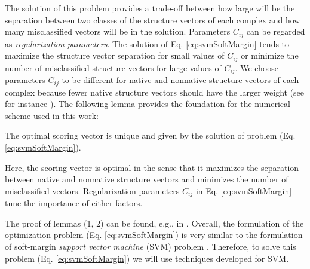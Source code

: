 The solution of this problem provides a trade-off between how large will be the separation between two classes of the structure vectors of each 
complex and how many misclassified vectors will be in the solution. Parameters $C_{ij}$ can be regarded as {\em regularization parameters}. 
The solution of Eq. \ref{eq:svmSoftMargin} tends to maximize the structure vector separation for small values of $C_{ij}$ or minimize the number 
of misclassified structure vectors for large values of  $C_{ij}$. We choose parameters $C_{ij}$ to be different for native and nonnative structure 
vectors of each complex because fewer native structure vectors should have the larger weight (see for instance \cite{Akbani2004}). 
%
The following lemma provides the foundation for the numerical scheme used in this work:
%
\begin{lemma}
The optimal scoring vector is unique and given by the solution of problem (Eq. \ref{eq:svmSoftMargin}).
\label{lemma2}
\end{lemma}
%
\begin{remark}
Here, the scoring vector is optimal in the sense that it maximizes the separation between native and nonnative structure vectors and minimizes the 
number of misclassified vectors. Regularization parameters $C_{ij}$ in Eq. \ref{eq:svmSoftMargin} tune the importance of either factors.
\end{remark}
%
The proof of lemmas (1, 2) can be found, e.g., in \cite{Crisp2000}.
Overall, the formulation of the optimization problem (Eq. \ref{eq:svmSoftMargin}) is very similar to the formulation of soft-margin 
\emph{support vector machine} (SVM) problem \cite{Cortes1995}. Therefore, to solve this problem (Eq. \ref{eq:svmSoftMargin})
 we will use techniques developed for SVM.
